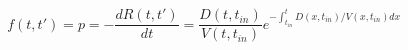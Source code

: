 \begin{equation}
f(t,t') = p= -\frac{dR(t,t')}{dt} = \frac{D(t,t_{in})}{V(t,t_{in})}e^{-\int_{t_{in}}^t D(x,t_{in})/V(x,t_{in}) dx}
\end{equation}